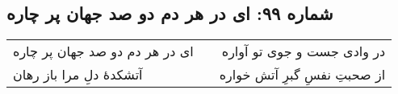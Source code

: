 \begin{center}
\section*{شماره ۹۹: ای در هر دم دو صد جهان پر چاره}
\label{sec:099}
\begin{longtable}{l p{0.5cm} r}
ای در هر دم دو صد جهان پر چاره
&&
در وادی جست و جوی تو آواره
\\
آتشکدهٔ دلِ مرا باز رهان
&&
از صحبتِ نفسِ گبرِ آتش خواره
\\
\end{longtable}
\end{center}
